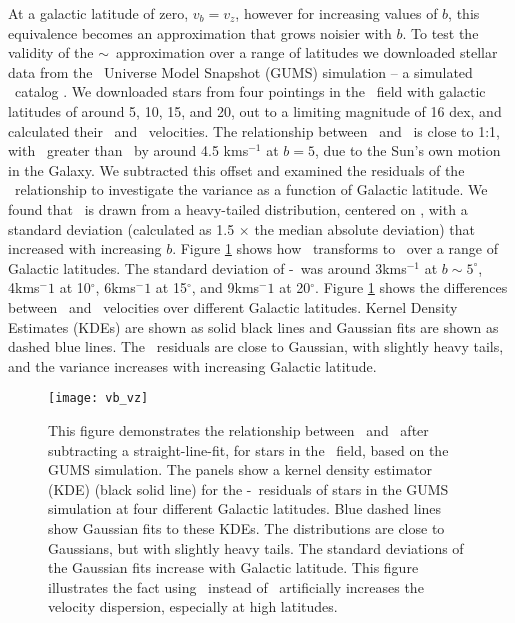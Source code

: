 At a galactic latitude of zero, $v_b=v_z$, however for increasing values of
$b$, this equivalence becomes an approximation that grows noisier with $b$.
To test the validity of the \vb$\sim$\vz\ approximation over a range of
latitudes we downloaded stellar data from the \Gaia\ Universe Model Snapshot
(GUMS) simulation -- a simulated \Gaia\ catalog \citep{robin2012}.
We downloaded stars from four pointings in the \kepler\ field with galactic
latitudes of around 5\degrees, 10\degrees, 15\degrees, and 20\degrees, out to
a limiting magnitude of 16 dex, and calculated their \vz\ and \vb\ velocities.
The relationship between \vz\ and \vb\ is close to 1:1, with \vz\ greater than
\vb\ by around 4.5 kms$^{-1}$ at $b=5$, due to the Sun's own motion in the
Galaxy.
We subtracted this offset and examined the residuals of the \vz\-\vb\
relationship to investigate the variance as a function of Galactic latitude.
We found that \vb\ is drawn from a heavy-tailed distribution, centered on \vz,
with a standard deviation (calculated as 1.5 $\times$ the median absolute
deviation) that increased with increasing $b$.
Figure \ref{fig:vb_vz} shows how \vz\ transforms to \vb\ over a range of
Galactic latitudes.
The standard deviation of \vz-\vb\ was around 3kms$^{-1}$ at $b \sim 5^\circ
$, 4kms${^-1}$ at 10$^\circ$, 6kms${^-1}$ at 15$^\circ$, and 9kms${^-1}$ at
20$^\circ$.
Figure \ref{fig:vb_vz} shows the differences between \vz\ and \vb\ velocities
over different Galactic latitudes.
Kernel Density Estimates (KDEs) are shown as solid black lines and Gaussian
fits are shown as dashed blue lines.
The \vb\-\vz\ residuals are close to Gaussian, with slightly heavy tails, and
the variance increases with increasing Galactic latitude.
\begin{figure}
  \caption{
This figure demonstrates the relationship between \vb\ and \vz\, after
    subtracting a straight-line-fit, for stars in
    the \kepler\ field, based on the GUMS simulation.
The panels show a kernel density estimator (KDE) (black solid line) for
    the \vz-\vb\ residuals of stars in the GUMS simulation at four different
    Galactic latitudes.
Blue dashed lines show Gaussian fits to these KDEs.
The distributions are close to Gaussians, but with slightly heavy tails.
The standard deviations of the Gaussian fits increase with Galactic latitude.
This figure illustrates the fact using \vb\ instead of \vz\ artificially
    increases the velocity dispersion, especially at high latitudes.
}
  \centering
    \texttt{[image: vb\_vz]}
\label{fig:vb_vz}
\end{figure}

